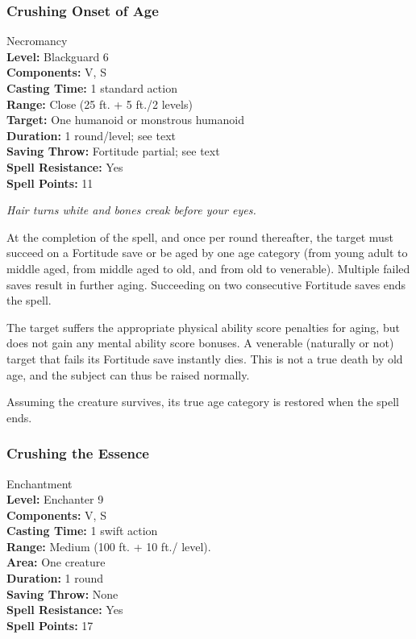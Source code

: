 \subsubsection{Crushing Onset of Age}
\label{Spell:CrushingOnsetOfAge}
Necromancy
\\ \textbf{Level:} Blackguard 6
\\ \textbf{Components:} V, S
\\ \textbf{Casting Time:} 1 standard action
\\ \textbf{Range:} Close (25 ft. + 5 ft./2 levels)
\\ \textbf{Target:} One humanoid or monstrous humanoid
\\ \textbf{Duration:} 1 round/level; see text
\\ \textbf{Saving Throw:} Fortitude partial; see text
\\ \textbf{Spell Resistance:} Yes
\\ \textbf{Spell Points:} 11

\emph{Hair turns white and bones creak before your eyes.}

At the completion of the spell, and once per round thereafter, the target must succeed on a Fortitude save or be aged by one age category (from young adult to middle aged, from middle aged to old, and from old to venerable). Multiple failed saves result in further aging. Succeeding on two consecutive Fortitude saves ends the spell.

The target suffers the appropriate physical ability score penalties for aging, but does not gain any mental ability score bonuses.
A venerable (naturally or not) target that fails its Fortitude save instantly dies. This is not a true death by old age, and the subject can thus be raised normally.

Assuming the creature survives, its true age category is restored when the spell ends.
\subsubsection{Crushing the Essence}
\label{Spell:CrushingTheEssence}
Enchantment
\\ \textbf{Level:} Enchanter 9
\\ \textbf{Components:} V, S
\\ \textbf{Casting Time:} 1 swift action
\\ \textbf{Range:} Medium (100 ft. + 10 ft./ level).
\\ \textbf{Area:} One creature
\\ \textbf{Duration:} 1 round
\\ \textbf{Saving Throw:} None
\\ \textbf{Spell Resistance:} Yes
\\ \textbf{Spell Points:} 17


